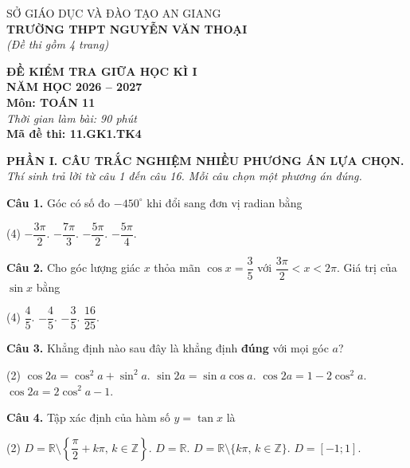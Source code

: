 \documentclass[12pt, a4paper]{article}
\newcommand{\cau}[1]{\vspace{0.12cm}\noindent\textbf{Câu #1. }}
\newcommand{\PhanI}{
\vspace{0.25cm}
\noindent\textbf{\large\sffamily PHẦN I. CÂU TRẮC NGHIỆM NHIỀU PHƯƠNG ÁN LỰA CHỌN.}
\textit{Thí sinh trả lời từ câu 1 đến câu 16. Mỗi câu chọn một phương án đúng.}\par\vspace{0.2cm}
}
\begin{document}
\noindent
\begin{minipage}[t]{0.52\textwidth}
\centering
SỞ GIÁO DỤC VÀ ĐÀO TẠO AN GIANG\\
\textbf{TRƯỜNG THPT NGUYỄN VĂN THOẠI}\\
\makebox[\linewidth][c]{\rule{4cm}{0.5pt}}\vspace{2mm}
\textit{(Đề thi gồm 4 trang)}
\end{minipage}
\hfill
\begin{minipage}[t]{0.45\textwidth}
\centering
\textbf{ĐỀ KIỂM TRA GIỮA HỌC KÌ I}\\
\textbf{NĂM HỌC 2026 -- 2027}\\
\textbf{Môn: TOÁN 11}\\
\textit{Thời gian làm bài: 90 phút}\\
\makebox[\linewidth][c]{\rule{4cm}{0.5pt}}\vspace{2mm}
\textbf{Mã đề thi: 11.GK1.TK4}
\end{minipage}
\vspace{0.3cm}

\PhanI

\cau{1} Góc có số đo $-450^\circ$ khi đổi sang đơn vị radian bằng
\begin{tasks}(4)
\task $-\dfrac{3\pi}{2}$.
\task $-\dfrac{7\pi}{3}$.
\task $-\dfrac{5\pi}{2}$.
\task $-\dfrac{5\pi}{4}$.
\end{tasks}

\cau{2} Cho góc lượng giác $x$ thỏa mãn $\cos x = \dfrac{3}{5}$ với $\dfrac{3\pi}{2} < x < 2\pi$. Giá trị của $\sin x$ bằng
\begin{tasks}(4)
\task $\dfrac{4}{5}$.
\task $-\dfrac{4}{5}$.
\task $-\dfrac{3}{5}$.
\task $\dfrac{16}{25}$.
\end{tasks}

\cau{3} Khẳng định nào sau đây là khẳng định \textbf{đúng} với mọi góc $a$?
\begin{tasks}(2)
\task $\cos 2a = \cos^2 a + \sin^2 a$.
\task $\sin 2a = \sin a\cos a$.
\task $\cos 2a = 1 - 2\cos^2 a$.
\task $\cos 2a = 2\cos^2 a - 1$.
\end{tasks}

\cau{4} Tập xác định của hàm số $y = \tan x$ là
\begin{tasks}(2)
\task $D = \mathbb{R}\setminus\left\{\dfrac{\pi}{2} + k\pi,\, k\in\mathbb{Z}\right\}$.
\task $D = \mathbb{R}$.
\task $D = \mathbb{R}\setminus\{k\pi,\, k\in\mathbb{Z}\}$.
\task $D = [-1; 1]$.
\end{tasks}
\end{document}
